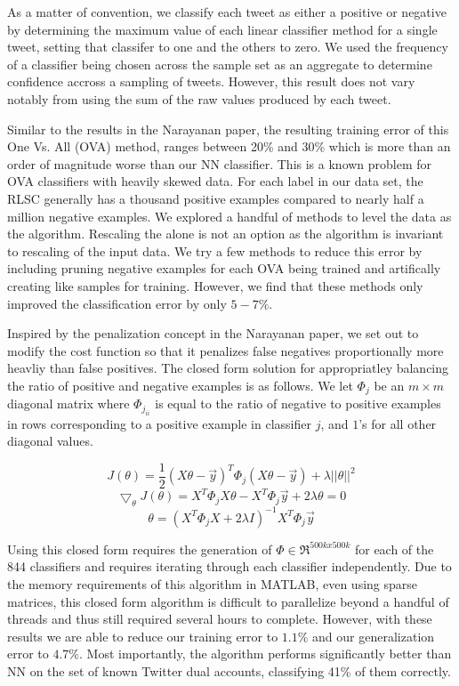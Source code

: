 \documentclass[10pt, conference, compsocconf]{IEEEtran}
\begin{document}
As a matter of convention, we classify each tweet as either a positive
or negative by determining the maximum value of each linear classifier
method for a single tweet, setting that classifer to one and the
others to zero.  We used the frequency of a classifier being chosen
across the sample set as an aggregate to determine confidence accross
a sampling of tweets.  However, this result does not vary notably from
using the sum of the raw values produced by each tweet.
  
Similar to the results in the Narayanan paper, the resulting training
error of this One Vs. All (OVA) method, ranges between 20\% and 30\%
which is more than an order of magnitude worse than our NN classifier.
This is a known problem for OVA classifiers with heavily skewed
data. For each label in our data set, the RLSC generally has a
thousand positive examples compared to nearly half a million negative
examples. We explored a handful of methods to level the data as the
algorithm.  Rescaling the alone is not an option as the algorithm is
invariant to rescaling of the input data. We try a few methods
\cite{Schapire} to reduce this error by including pruning \cite{Dekel}
negative examples for each OVA being trained and artifically creating
like samples for training.  However, we find that these methods only
improved the classification error by only $5-7\%$.

Inspired by the penalization concept in the Narayanan paper, we set
out to modify the cost function so that it penalizes false negatives
proportionally more heavliy than false positives. The closed form
solution for appropriatley balancing the ratio of positive and
negative examples is as follows. We let $\Phi_j$ be an $m \times m$
diagonal matrix where $\Phi_{j_{ii}}$ is equal to the ratio of
negative to positive examples in rows corresponding to a positive
example in classifier $j$, and $1$'s for all other diagonal values.

$$J(\theta) = \frac{1}{2} (X\theta - \vec{y})^T \Phi_j (X\theta-\vec{y}) + \lambda ||\theta||^2 $$
$$ \bigtriangledown_\theta J(\theta) = X^T \Phi_j X \theta -X^T \Phi_j \vec{y} +2 \lambda \theta = 0$$
$$ \theta= (X^T\Phi_j X+2 \lambda I)^{-1} X^T \Phi_j \vec{y}$$

Using this closed form requires the generation of $\Phi \in \Re^{500k
  x 500k}$ for each of the 844 classifiers and requires iterating
through each classifier independently.  Due to the memory requirements
of this algorithm in MATLAB, even using sparse matrices, this closed
form algorithm is difficult to parallelize beyond a handful of threads
and thus still required several hours to complete.  However, with
these results we are able to reduce our training error to $1.1\%$ and
our generalization error to $4.7\%$. Most importantly, the algorithm
performs significantly better than NN on the set of known Twitter dual
accounts, classifying 41\% of them correctly.
\end{document}
